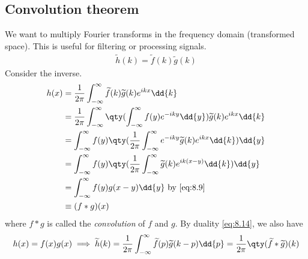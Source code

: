 \subsection{Convolution theorem}
We want to multiply Fourier transforms in the frequency domain (transformed space).
This is useful for filtering or processing signals.
\begin{align*}
	\widetilde h(k) = \widetilde f(k) \widetilde g(k)
\end{align*}
Consider the inverse.
\begin{align}
	h(x) &= \frac{1}{2\pi} \int_{-\infty}^\infty \widetilde f(k) \widetilde g(k) e^{ikx} \dd{k} \notag \\
	&= \frac{1}{2\pi} \int_{-\infty}^\infty \qty(\int_{-\infty}^\infty f(y) e^{-iky} \dd{y}) \widetilde g(k) e^{ikx} \dd{k} \notag \\
	&= \int_{-\infty}^\infty f(y) \qty( \frac{1}{2\pi} \int_{-\infty}^\infty e^{-iky} \widetilde g(k) e^{ikx} \dd{k} ) \dd{y} \notag \\
	&= \int_{-\infty}^\infty f(y) \qty( \frac{1}{2\pi} \int_{-\infty}^\infty \widetilde g(k) e^{ik(x-y)} \dd{k} ) \dd{y} \notag \\
	&= \int_{-\infty}^\infty f(y) g(x-y) \dd{y} \text{ by \cref{eq:8.9}} \notag \\
	&\equiv (f \ast g)(x) \label{eq:8.17}
\end{align}
where $f \ast g$ is called the \textit{convolution} of $f$ and $g$.
By duality \cref{eq:8.14}, we also have
\begin{align} \label{eq:8.18}
	h(x) = f(x) g(x) \implies \widetilde h(k) = \frac{1}{2\pi} \int_{-\infty}^\infty \widetilde f(p) \widetilde g(k-p) \dd{p} = \frac{1}{2\pi}\qty(\widetilde f \ast \widetilde g)(k)
\end{align}

